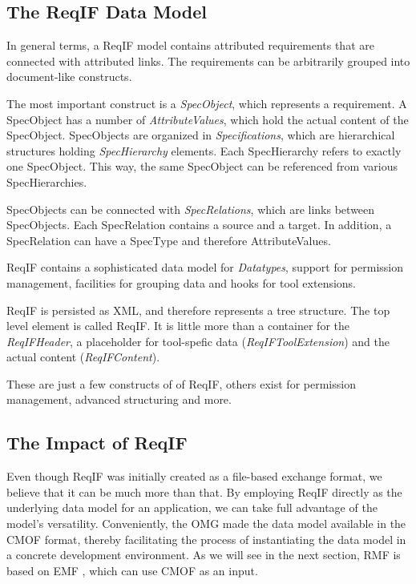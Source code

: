 \documentclass{template/openetcs_report}
\begin{document}
\subsection{The ReqIF Data Model}

In general terms, a ReqIF model contains attributed requirements that are connected with attributed links.  The requirements can be arbitrarily grouped into document-like constructs.

The most important construct is a {\em SpecObject}, which represents a requirement. A SpecObject has a number of {\em AttributeValues}, which hold the actual content of the SpecObject. SpecObjects are organized in {\em Specifications}, which are hierarchical structures holding {\em SpecHierarchy} elements. Each SpecHierarchy refers to exactly one SpecObject. This way, the same SpecObject can be referenced from various SpecHierarchies.

SpecObjects can be connected with \emph{SpecRelations}, which are links between SpecObjects. Each SpecRelation contains a source and a target.  In addition, a SpecRelation can have a SpecType and therefore AttributeValues.

ReqIF contains a sophisticated data model for {\em Datatypes}, support for permission management, facilities for grouping data and hooks for tool extensions.

ReqIF is persisted as XML, and therefore represents a tree structure.  The top level element is called ReqIF.  It is little more than a container for the \emph{ReqIFHeader}, a placeholder for tool-spefic data (\emph{ReqIFToolExtension}) and the actual content (\emph{ReqIFContent}).

These are just a few constructs of of ReqIF, others exist for permission management, advanced structuring and more.

\subsection{The Impact of ReqIF}

Even though ReqIF was initially created as a file-based exchange format, we believe that it can be much more than that.  By employing ReqIF directly as the underlying data model for an application, we can take full advantage of the model's versatility.  Conveniently, the OMG made the data model available in the CMOF format, thereby facilitating the process of instantiating the data model in a concrete development environment.  As we will see in the next section, RMF is based on EMF \cite{emf}, which can use CMOF as an input.
\end{document}
